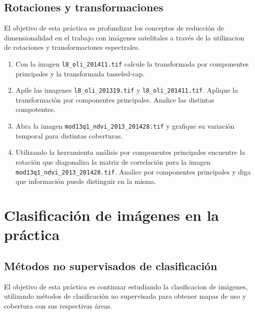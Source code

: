 \documentclass[hidelinks,12pt]{article}
\begin{document}
\subsection{Rotaciones y transformaciones \label{rot:pra}}
El objetivo de esta práctica es  profundizar los conceptos de reducción
de dimensionalidad en el trabajo con imágenes satelitales a través de la
utilizacion de rotaciones y transformaciones espectrales.

\begin{enumerate}
    \item Con la imagen \texttt{l8\_oli\_2014\-11.tif} calcule la
        transformada por componentes principales y la transformada tasseled-cap.
    \item \label{pca} Apile las imagenes
        \texttt{l8\_oli\_2013\-19.tif}
        y \texttt{l8\_oli\_2014\-11.tif}.
        Aplique la transformaci\'on por componentes principales.
        Analice las distintas compotentes.
    \item Abra la imagen \texttt{mod13q1\_ndvi\_2013\_2014\-28.tif}
        y grafique su variación temporal para distintas coberturas.
    \item Utilizando la herramienta análisis por componentes principales
        encuentre la rotación que diagonaliza la matriz de correlación para la
        imagen \texttt{mod13q1\_ndvi\_2013\_2014\-28.tif}. Analice
        por componentes principales y diga que información puede distinguir en
        la misma.
\end{enumerate}
\newpage
\section{Clasificación de imágenes en la práctica}
\subsection{Métodos no supervisados de clasificación}
El objetivo de esta práctica es continuar estudiando la clasificacion de imágenes, utilizando métodos de clasificación no supervisada para obtener
mapas de uso y cobertura con sus respectivas áreas.
\end{document}
